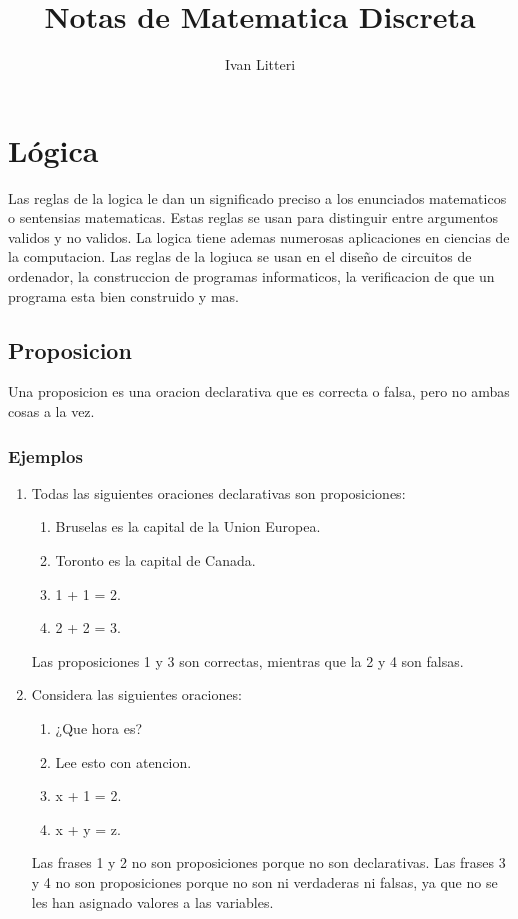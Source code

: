 \documentclass[]{article}
\title{Notas de Matematica Discreta}
\author{Ivan Litteri}
\date{}
\begin{document}
\maketitle

\section{Lógica}\label{sec:logica}

Las reglas de la logica le dan un significado preciso a los enunciados matematicos o sentensias matematicas. Estas reglas se usan para distinguir entre argumentos validos y no validos. La logica tiene ademas numerosas aplicaciones en ciencias de la computacion. Las reglas de la logiuca se usan en el diseño de circuitos de ordenador, la construccion de programas informaticos, la verificacion de que un programa esta bien construido y mas.

\subsection*{Proposicion}\label{sec:logica-proposicion}

Una proposicion es una oracion declarativa que es correcta o falsa, pero no ambas cosas a la vez.

\subsubsection*{Ejemplos}

\begin{enumerate}
	\item Todas las siguientes oraciones declarativas son proposiciones:
		\begin{enumerate}
			\item Bruselas es la capital de la Union Europea.
			\item Toronto es la capital de Canada.
			\item 1 + 1 = 2.
			\item 2 + 2 = 3.
		\end{enumerate}
	Las proposiciones 1 y 3 son correctas, mientras que la 2 y 4 son falsas.
	
	\item Considera las siguientes oraciones:
		\begin{enumerate}
			\item ¿Que hora es?
			\item Lee esto con atencion.
			\item x + 1 = 2.
			\item x + y = z.
		\end{enumerate}
	Las frases 1 y 2 no son proposiciones porque no son declarativas. Las frases 3 y 4 no son proposiciones porque no son ni verdaderas ni falsas, ya que no se les han asignado valores a las variables. 
\end{enumerate}
\end{document}
